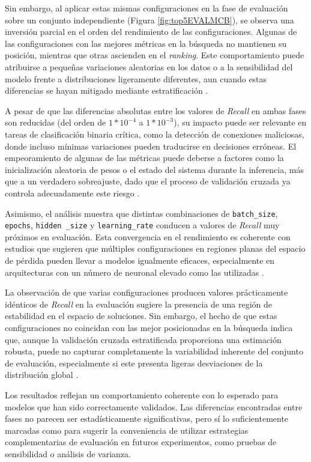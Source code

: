 Sin embargo, al aplicar estas mismas configuraciones en la fase de evaluación sobre un conjunto independiente (Figura \ref{fig:top5EVALMCB}), se observa una inversión parcial en el orden del rendimiento de las configuraciones. Algunas de las configuraciones con las mejores métricas en la búsqueda no mantienen su posición, mientras que otras ascienden en el \textit{ranking}. Este comportamiento puede atribuirse a pequeñas variaciones aleatorias en los datos o a la sensibilidad del modelo frente a distribuciones ligeramente diferentes, aun cuando estas diferencias se hayan mitigado mediante estratificación \cite{reimers2017optimal}.

A pesar de que las diferencias absolutas entre los valores de \textit{Recall} en ambas fases son reducidas (del orden de $1*10^{-4}$ a $1*10^{-3}$), su impacto puede ser relevante en tareas de clasificación binaria crítica, como la detección de conexiones maliciosas, donde incluso mínimas variaciones pueden traducirse en decisiones erróneas. El empeoramiento de algunas de las métricas puede deberse a factores como la inicialización aleatoria de pesos o el estado del sistema durante la inferencia, más que a un verdadero sobreajuste, dado que el proceso de validación cruzada ya controla adecuadamente este riesgo \cite{goodfellow2016deep}.

Asimismo, el análisis muestra que distintas combinaciones de \texttt{batch\_size}, \texttt{epochs}, \texttt{hidden \_size} y \texttt{learning\_rate} conducen a valores de \textit{Recall} muy próximos en evaluación. Esta convergencia en el rendimiento es coherente con estudios que sugieren que múltiples configuraciones en regiones planas del espacio de pérdida pueden llevar a modelos igualmente eficaces, especialmente en arquitecturas con un número de neuronal elevado como las utilizadas \cite{bouthillier2021sloppy}.

La observación de que varias configuraciones producen valores prácticamente idénticos de \textit{Recall} en la evaluación sugiere la presencia de una región de estabilidad en el espacio de soluciones. Sin embargo, el hecho de que estas configuraciones no coincidan con las mejor posicionadas en la búsqueda indica que, aunque la validación cruzada estratificada proporciona una estimación robusta, puede no capturar completamente la variabilidad inherente del conjunto de evaluación, especialmente si este presenta ligeras desviaciones de la distribución global \cite{recht2019imagenet}.

Los resultados reflejan un comportamiento coherente con lo esperado para modelos que han sido correctamente validados. Las diferencias encontradas entre fases no parecen ser estadísticamente significativas, pero sí lo suficientemente marcadas como para sugerir la conveniencia de utilizar estrategias complementarias de evaluación en futuros experimentos, como pruebas de sensibilidad o análisis de varianza.


